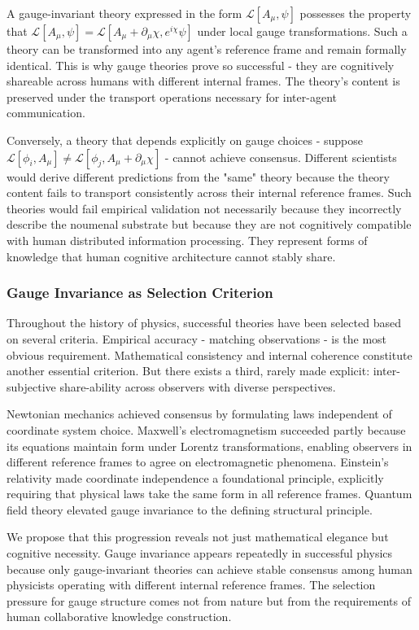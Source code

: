 \documentclass[11pt]{article}
\begin{document}
A gauge-invariant theory expressed in the form $\mathcal{L}[A_\mu, \psi]$ possesses the property that $\mathcal{L}[A_\mu, \psi] = \mathcal{L}[A_\mu + \partial_\mu\chi, e^{i\chi}\psi]$ under local gauge transformations. Such a theory can be transformed into any agent's reference frame and remain formally identical. This is why gauge theories prove so successful - they are cognitively shareable across humans with different internal frames. The theory's content is preserved under the transport operations necessary for inter-agent communication.

Conversely, a theory that depends explicitly on gauge choices - suppose $\mathcal{L}[\phi_i, A_\mu] \neq \mathcal{L}[\phi_j, A_\mu + \partial_\mu\chi]$ - cannot achieve consensus. Different scientists would derive different predictions from the "same" theory because the theory content fails to transport consistently across their internal reference frames. Such theories would fail empirical validation not necessarily because they incorrectly describe the noumenal substrate but because they are not cognitively compatible with human distributed information processing. They represent forms of knowledge that human cognitive architecture cannot stably share.

\subsubsection{Gauge Invariance as Selection Criterion}

Throughout the history of physics, successful theories have been selected based on several criteria. Empirical accuracy - matching observations - is the most obvious requirement. Mathematical consistency and internal coherence constitute another essential criterion. But there exists a third, rarely made explicit: inter-subjective share-ability across observers with diverse perspectives.

Newtonian mechanics achieved consensus by formulating laws independent of coordinate system choice. Maxwell's electromagnetism succeeded partly because its equations maintain form under Lorentz transformations, enabling observers in different reference frames to agree on electromagnetic phenomena. Einstein's relativity made coordinate independence a foundational principle, explicitly requiring that physical laws take the same form in all reference frames. Quantum field theory elevated gauge invariance to the defining structural principle.

We propose that this progression reveals not just mathematical elegance but cognitive necessity. Gauge invariance appears repeatedly in successful physics because only gauge-invariant theories can achieve stable consensus among human physicists operating with different internal reference frames. The selection pressure for gauge structure comes not from nature but from the requirements of human collaborative knowledge construction.
\end{document}
